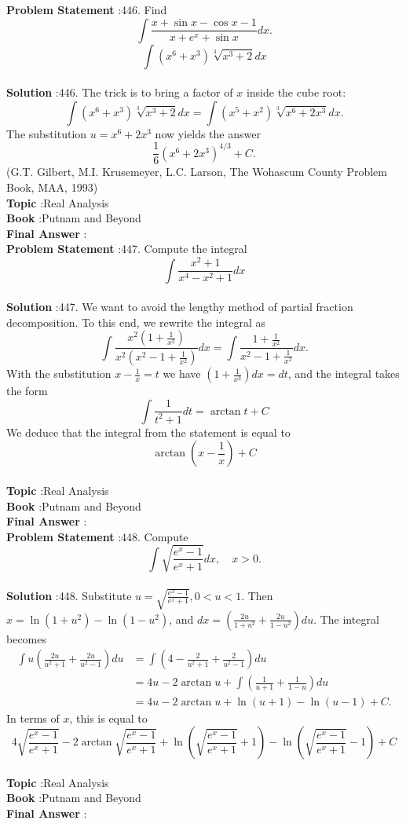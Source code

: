 \documentclass[10pt]{article}
\begin{document}
\textbf{Problem Statement} :446. Find$$ \int \frac{x+\sin x-\cos x-1}{x+e^{x}+\sin x} d x . $$$$ \int\left(x^{6}+x^{3}\right) \sqrt[3]{x^{3}+2} d x $$\\
\textbf{Solution} :446. The trick is to bring a factor of $x$ inside the cube root:$$ \int\left(x^{6}+x^{3}\right) \sqrt[3]{x^{3}+2} d x=\int\left(x^{5}+x^{2}\right) \sqrt[3]{x^{6}+2 x^{3}} d x . $$The substitution $u=x^{6}+2 x^{3}$ now yields the answer$$ \frac{1}{6}\left(x^{6}+2 x^{3}\right)^{4 / 3}+C . $$(G.T. Gilbert, M.I. Krusemeyer, L.C. Larson, The Wohascum County Problem Book, MAA, 1993)\\
\textbf{Topic} :Real Analysis\\
\textbf{Book} :Putnam and Beyond\\
\textbf{Final Answer} :\\


\textbf{Problem Statement} :447. Compute the integral$$ \int \frac{x^{2}+1}{x^{4}-x^{2}+1} d x $$\\
\textbf{Solution} :447. We want to avoid the lengthy method of partial fraction decomposition. To this end, we rewrite the integral as$$ \int \frac{x^{2}\left(1+\frac{1}{x^{2}}\right)}{x^{2}\left(x^{2}-1+\frac{1}{x^{2}}\right)} d x=\int \frac{1+\frac{1}{x^{2}}}{x^{2}-1+\frac{1}{x^{2}}} d x . $$With the substitution $x-\frac{1}{x}=t$ we have $\left(1+\frac{1}{x^{2}}\right) d x=d t$, and the integral takes the form$$ \int \frac{1}{t^{2}+1} d t=\arctan t+C $$We deduce that the integral from the statement is equal to$$ \arctan \left(x-\frac{1}{x}\right)+C $$\\
\textbf{Topic} :Real Analysis\\
\textbf{Book} :Putnam and Beyond\\
\textbf{Final Answer} :\\


\textbf{Problem Statement} :448. Compute$$ \int \sqrt{\frac{e^{x}-1}{e^{x}+1}} d x, \quad x>0 . $$\\
\textbf{Solution} :448. Substitute $u=\sqrt{\frac{e^{x}-1}{e^{x}+1}}, 0<u<1$. Then $x=\ln \left(1+u^{2}\right)-\ln \left(1-u^{2}\right)$, and $d x=\left(\frac{2 u}{1+u^{2}}+\frac{2 u}{1-u^{2}}\right) d u$. The integral becomes$$ \begin{aligned} \int u\left(\frac{2 u}{u^{2}+1}+\frac{2 u}{u^{2}-1}\right) d u &=\int\left(4-\frac{2}{u^{2}+1}+\frac{2}{u^{2}-1}\right) d u \\ &=4 u-2 \arctan u+\int\left(\frac{1}{u+1}+\frac{1}{1-u}\right) d u \\ &=4 u-2 \arctan u+\ln (u+1)-\ln (u-1)+C . \end{aligned} $$In terms of $x$, this is equal to$$ 4 \sqrt{\frac{e^{x}-1}{e^{x}+1}}-2 \arctan \sqrt{\frac{e^{x}-1}{e^{x}+1}}+\ln \left(\sqrt{\frac{e^{x}-1}{e^{x}+1}}+1\right)-\ln \left(\sqrt{\frac{e^{x}-1}{e^{x}+1}}-1\right)+C $$\\
\textbf{Topic} :Real Analysis\\
\textbf{Book} :Putnam and Beyond\\
\textbf{Final Answer} :\\
\end{document}
